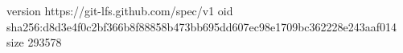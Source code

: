 version https://git-lfs.github.com/spec/v1
oid sha256:d8d3e4f0c2bf366b8f88858b473bb695dd607ec98e1709bc362228e243aaf014
size 293578
